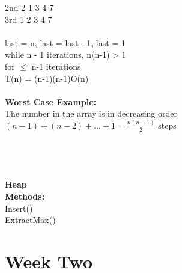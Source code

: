 \documentclass{article}
\begin{document}
		  2nd   2 1 3 4 7\\
		  3rd   1 2 3 4 7\\\\
		  last = n, last = last - 1, last = 1\\
		  while n - 1 iterations, n(n-1) > 1\\
		  for $\le$ n-1 iterations\\
		  T(n) = (n-1)(n-1)O(n)\\\\
		  \textbf{Worst Case Example:}\\
			The number in the array is in decreasing order\\
			$(n-1)+(n-2)+...+1=\frac{n(n-1)}{2}$ steps\\\\\\\\\\
		\large{\textbf{Heap}}\\
		\textbf{Methods:}\\
		Insert()\\
		ExtractMax()\\
		
	\section{Week Two}
\end{document}
